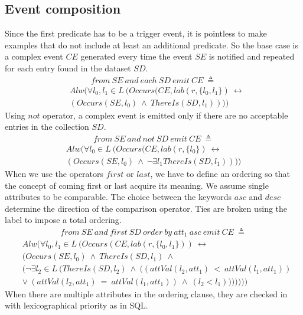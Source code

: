 \subsection{Event composition}
Since the first predicate has to be a trigger event, it is pointless to make examples that do not include at least an additional predicate. So the base case is a complex event $CE$ generated every time the event $SE$ is notified and repeated for each entry found in the dataset $SD$.
\begin{align*}%
from\ SE\ and\ each\ SD\ emit\ CE\ \triangleq
\end{align*}
\begin{align*}
&Alw(\forall l_0, l_1 \in L\ (Occurs(CE, lab(r, \{l_0, l_1\})\ \leftrightarrow\\
&(Occurs(SE, l_0)\ \wedge\ ThereIs(SD, l_1))))
\end{align*}
Using $not$ operator, a complex event is emitted only if there are no acceptable entries in the collection $SD$.
\begin{align*}%
from\ SE\ and\ not\ SD\ emit\ CE\ \triangleq
\end{align*}
\begin{align*}
Alw(\forall l_0 \in L\ (Occurs(CE, lab(r, \{l_0\})\ \leftrightarrow\\
(Occurs(SE, l_0)\ \wedge\ \neg \exists l_1 ThereIs(SD, l_1))))
\end{align*}
When we use the operators $first$ or $last$, we have to define an ordering so that the concept of coming first or last acquire its meaning. We assume single attributes to be comparable. The choice between the keywords $asc$ and $desc$ determine the direction of the comparison operator. Ties are broken using the label to impose a total ordering.
\begin{align*}%
from\ SE\ and\ first\ SD\ order\ by\ att_1\ asc\ emit\ CE\ \triangleq
\end{align*}
\begin{align*}
&Alw(\forall l_0, l_1 \in L\ (Occurs(CE, lab(r, \{l_0, l_1\}))\ \leftrightarrow\\
&(Occurs(SE, l_0)\ \wedge\ ThereIs(SD, l_1)\ \wedge\\
&(\neg \exists l_2 \in L\ (ThereIs(SD, l_2)\ \wedge\ ((attVal(l_2, att_1)\ <\ attVal(l_1, att_1))\\
&\lor\ (attVal(l_2, att_1)\ =\ attVal(l_1, att_1))\ \wedge\ (l_2 < l_1)))))))
\end{align*}
When there are multiple attributes in the ordering clause, they are checked in with lexicographical priority as in SQL.
